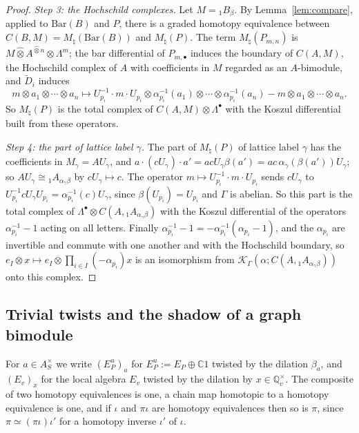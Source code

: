 \documentclass[11pt]{amsart}
\theoremstyle{definition}
\theoremstyle{remark}
\newcommand{\C}{\mathbb C}
\newcommand{\Q}{\mathbb Q}
\begin{document}
\begin{proof}
\emph{Step 3: the Hochschild complexes.}  Let $M={}_{1}B_{\beta}$.  By
Lemma~\ref{lem:compare}, applied to $\mathrm{Bar}(B)$ and $P$, there is a
graded homotopy equivalence between $C(B,M)=M_{\natural}(\mathrm{Bar}(B))$ and
$M_{\natural}(P)$.  The term $M_{\natural}(P_{m,n})$ is $M\widehat\otimes
A^{\widehat\otimes n}\otimes\Lambda^{m}$; the bar differential of
$P_{m,\bullet}$ induces the boundary of $C(A,M)$, the Hochschild complex of $A$
with coefficients in $M$ regarded as an $A$-bimodule, and $\widetilde D_i$
induces
\[
m\otimes a_1\otimes\cdots\otimes a_n\mapsto
U_{p_i}^{-1}\cdot m\cdot U_{p_i}\otimes\alpha_{p_i}^{-1}(a_1)\otimes\cdots
\otimes\alpha_{p_i}^{-1}(a_n)-m\otimes a_1\otimes\cdots\otimes a_n .
\]
So $M_{\natural}(P)$ is the total complex of $C(A,M)\otimes\Lambda^{\bullet}$ with
the Koszul differential built from these operators.

\emph{Step 4: the part of lattice label $\gamma$.}  The part of
$M_{\natural}(P)$ of lattice label $\gamma$ has the coefficients in
$M_{\gamma}=AU_{\gamma}$, and
$a\cdot(cU_{\gamma})\cdot a'=
acU_{\gamma}\beta(a')=ac\,\alpha_{\gamma}(\beta(a'))U_{\gamma}$; so
$AU_{\gamma}\cong{}_{1}A_{\alpha_{\gamma}\beta}$ by $cU_{\gamma}\mapsto c$.  The
operator $m\mapsto U_{p_i}^{-1}\cdot m\cdot U_{p_i}$ sends $cU_{\gamma}$ to
$U_{p_i}^{-1}cU_{\gamma}U_{p_i}=\alpha_{p_i}^{-1}(c)U_{\gamma}$, since
$\beta(U_{p_i})=U_{p_i}$ and $\Gamma$ is abelian.  So this part is the total
complex of $\Lambda^{\bullet}\otimes
C(A,{}_{1}A_{\alpha_{\gamma}\beta})$ with the Koszul differential of the
operators $\alpha_{p_i}^{-1}-1$ acting on all letters.  Finally
$\alpha_{p_i}^{-1}-1=-\alpha_{p_i}^{-1}(\alpha_{p_i}-1)$, and the
$\alpha_{p_i}$ are invertible and commute with one another and with the
Hochschild boundary, so $e_I\otimes x\mapsto e_I\otimes
\prod_{i\in I}(-\alpha_{p_i})x$ is an isomorphism from
$\mathcal K_{\Gamma}(\alpha;C(A,{}_{1}A_{\alpha_{\gamma}\beta}))$ onto this
complex.
\end{proof}

\subsection{Trivial twists and the shadow of a graph bimodule}

For $a\in A_S^{\times}$ we write $(E_P^{u})_{a}$ for $E_P^{u}:=E_P\oplus\C1$
twisted by the dilation $\beta_a$, and $(E_v)_{x}$ for the local algebra $E_v$
twisted by the dilation by $x\in\Q_v^{\times}$.  The composite of two homotopy
equivalences is one, a chain map homotopic
to a homotopy equivalence is one, and if $\iota$ and $\pi\iota$ are homotopy
equivalences then so is $\pi$, since $\pi\simeq(\pi\iota)\iota'$ for a homotopy
inverse $\iota'$ of $\iota$.
\end{document}
